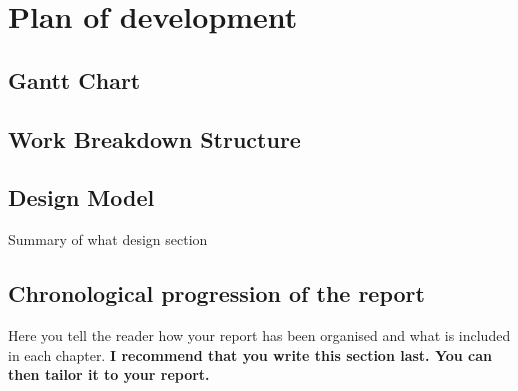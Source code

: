 \section{Plan of development}
\subsection{Gantt Chart}
\subsection{Work Breakdown Structure}
\subsection{Design Model}
Summary of what design section
\subsection{Chronological progression of the report}
Here you tell the reader how your report has been organised and what is included in each
chapter.
{\bf I recommend that you write this section last. You can then tailor it to your report.}
